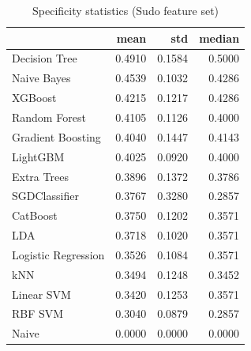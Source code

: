 \begin{table}
\caption{Specificity statistics (Sudo feature set)}
\label{tab:specificity_Sudo_stats}
\begin{tabular}{lrrr}
\toprule
 & mean & std & median \\
\midrule
Decision Tree & 0.4910 & 0.1584 & 0.5000 \\
Naive Bayes & 0.4539 & 0.1032 & 0.4286 \\
XGBoost & 0.4215 & 0.1217 & 0.4286 \\
Random Forest & 0.4105 & 0.1126 & 0.4000 \\
Gradient Boosting & 0.4040 & 0.1447 & 0.4143 \\
LightGBM & 0.4025 & 0.0920 & 0.4000 \\
Extra Trees & 0.3896 & 0.1372 & 0.3786 \\
SGDClassifier & 0.3767 & 0.3280 & 0.2857 \\
CatBoost & 0.3750 & 0.1202 & 0.3571 \\
LDA & 0.3718 & 0.1020 & 0.3571 \\
Logistic Regression & 0.3526 & 0.1084 & 0.3571 \\
kNN & 0.3494 & 0.1248 & 0.3452 \\
Linear SVM & 0.3420 & 0.1253 & 0.3571 \\
RBF SVM & 0.3040 & 0.0879 & 0.2857 \\
Naive & 0.0000 & 0.0000 & 0.0000 \\
\bottomrule
\end{tabular}
\end{table}

